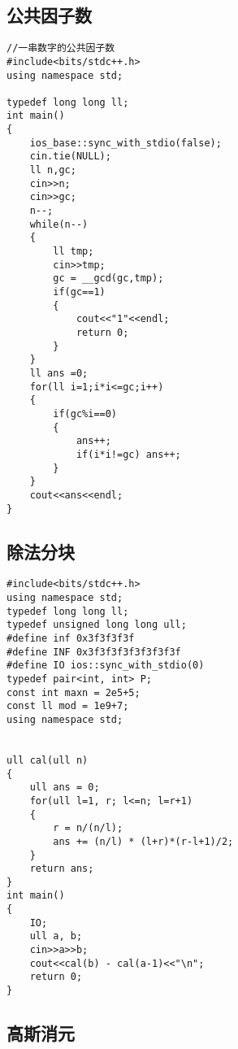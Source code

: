 \subsection{公共因子数}
\begin{lstlisting}
//一串数字的公共因子数
#include<bits/stdc++.h>
using namespace std;

typedef long long ll;
int main()
{
	ios_base::sync_with_stdio(false);
	cin.tie(NULL);
	ll n,gc;
	cin>>n;
	cin>>gc;
	n--;
	while(n--)
	{
		ll tmp;
		cin>>tmp;
		gc = __gcd(gc,tmp);
		if(gc==1)
		{
			cout<<"1"<<endl;
			return 0;
		}
	}
	ll ans =0;
	for(ll i=1;i*i<=gc;i++)
	{
		if(gc%i==0)
		{
			ans++;
			if(i*i!=gc) ans++;
		}
	}
	cout<<ans<<endl;
}
\end{lstlisting}

\subsection{除法分块}
\begin{lstlisting}
#include<bits/stdc++.h>
using namespace std;
typedef long long ll;
typedef unsigned long long ull;
#define inf 0x3f3f3f3f
#define INF 0x3f3f3f3f3f3f3f3f
#define IO ios::sync_with_stdio(0)
typedef pair<int, int> P;
const int maxn = 2e5+5;
const ll mod = 1e9+7;
using namespace std;


ull cal(ull n)
{
	ull ans = 0;
	for(ull l=1, r; l<=n; l=r+1)
	{
		r = n/(n/l);
		ans += (n/l) * (l+r)*(r-l+1)/2;
	}
	return ans;
}
int main()
{
	IO;
	ull a, b;
	cin>>a>>b;
	cout<<cal(b) - cal(a-1)<<"\n";
	return 0;
}
\end{lstlisting}

\subsection{高斯消元}
